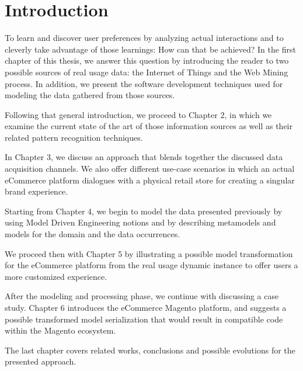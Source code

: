 
\chapter*{Introduction}

To learn and discover user preferences by analyzing actual interactions and to cleverly take advantage of those learnings: How can that be achieved? In the first chapter of this thesis, we answer this question by introducing the reader to two possible sources of real usage data: the Internet of Things and the Web Mining process. In addition, we present the software development techniques used for modeling the data gathered from those sources.

Following that general introduction, we proceed to Chapter 2, in which we examine the current state of the art of those information sources as well as their related pattern recognition techniques.

In Chapter 3, we discuss an approach that blends together the discussed data acquisition channels. We also offer different use-case scenarios in which an actual eCommerce platform dialogues with a physical retail store for creating a singular brand experience.

Starting from Chapter 4, we begin to model the data presented previously by using Model Driven Engineering notions and by describing metamodels and models for the domain and the data occurrences. 

We proceed then with Chapter 5 by illustrating a possible model transformation for the eCommerce platform from the real usage dynamic instance to offer users a more customized experience.

After the modeling and processing phase, we continue with discussing a case study. Chapter 6 introduces the eCommerce Magento platform, and suggests a possible transformed model serialization that would result in compatible code within the Magento ecosystem.

The last chapter covers related works, conclusions and possible evolutions for the presented approach.

